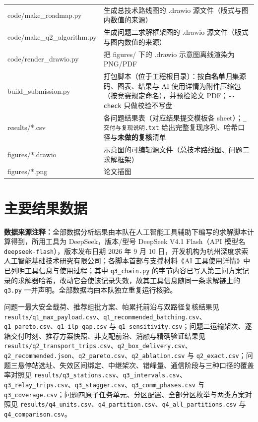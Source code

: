 \begin{xltabular}{0.98\textwidth}{lX}
		code/make\_roadmap.py & 生成总技术路线图的 .drawio 源文件（版式与图内数值的来源） \\
		code/make\_q2\_algorithm.py & 生成问题二求解框架图的 .drawio 源文件（版式与图内数值的来源） \\
		code/render\_drawio.py & 把 figures/ 下的 .drawio 示意图离线渲染为 PNG/PDF \\
		build\_submission.py & 打包脚本（位于工程根目录）：按\textbf{白名单}归集源码、图表、结果与 AI 使用详情为附件压缩包（按竞赛规定命名），并预检论文 PDF；\texttt{-{}-check} 只做校验不写盘 \\
		results/*.csv & 各问题结果表（对应结果提交模板各 sheet）；\texttt{\_交付与复现说明.txt} 给出完整复现序列、哈希口径与\textbf{未做的复核}清单 \\
		figures/*.drawio & 示意图的可编辑源文件（总技术路线图、问题二求解框架） \\
		figures/*.png & 论文插图 \\
\end{xltabular}

\section{主要结果数据}

\begin{sloppypar}
\noindent\textbf{数据来源注释：}全部数据分析结果由本队在人工智能工具辅助下编写的求解脚本计算得到，所用工具为 DeepSeek，版本/型号 DeepSeek V4.1 Flash（API 模型名 \texttt{deepseek-flash}），版本发布日期 2026 年 9 月 10 日，开发机构为杭州深度求索人工智能基础技术研究有限公司\cite{deepseek2026}；各脚本首部与支撑材料《AI 工具使用详情》中已列明工具信息与使用过程；其中 \texttt{q3\_chain.py} 的字节内容已写入第三问方案记录的求解器哈希，改动它会使该记录失效，故其工具信息随同一条求解链上的 \texttt{q3.py} 一并声明。全部数据均由本队独立重复运行核验。

问题一最大安全载荷、推荐组批方案、帕累托前沿与双路径复核结果见 \texttt{results/q1\_max\_payload.csv}、\texttt{q1\_recommended\_batching.csv}、\texttt{q1\_pareto.csv}、\texttt{q1\_ilp\_gap.csv} 与 \texttt{q1\_sensitivity.csv}；问题二运输架次、逐箱交付时刻、推荐方案快照、非支配前沿、消融与精确验证结果见 \texttt{results/q2\_transport\_trips.csv}、\texttt{q2\_box\_delivery.csv}、\texttt{q2\_recommended.json}、\texttt{q2\_pareto.csv}、\texttt{q2\_ablation.csv} 与 \texttt{q2\_exact.csv}；问题三悬停站选址、失效区间绑定、中继架次、错峰量、通信阶段与三种口径的覆盖率对照见 \texttt{results/q3\_stations.csv}、\texttt{q3\_intervals.csv}、\texttt{q3\_relay\_trips.csv}、\texttt{q3\_stagger.csv}、\texttt{q3\_comm\_phases.csv} 与 \texttt{q3\_coverage.csv}；问题四原子任务单元、分区配置、全部分区枚举与两类方案对照见 \texttt{results/q4\_units.csv}、\texttt{q4\_partition.csv}、\texttt{q4\_all\_partitions.csv} 与 \texttt{q4\_comparison.csv}。
\end{sloppypar}

